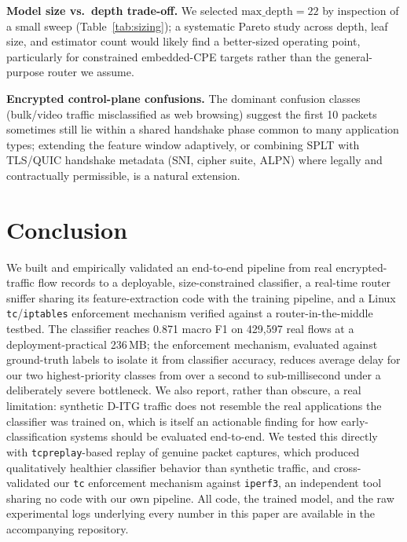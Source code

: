 \documentclass[10pt,twocolumn]{article}
\begin{document}
\textbf{Model size vs.\ depth trade-off.} We selected \(\text{max\_depth}=22\)
by inspection of a small sweep (Table~\ref{tab:sizing}); a systematic
Pareto study across depth, leaf size, and estimator count would likely
find a better-sized operating point, particularly for constrained
embedded-CPE targets rather than the general-purpose router we assume.

\textbf{Encrypted control-plane confusions.} The dominant confusion
classes (bulk/video traffic misclassified as web browsing) suggest the
first 10 packets sometimes still lie within a shared handshake phase
common to many application types; extending the feature window
adaptively, or combining SPLT with TLS/QUIC handshake metadata (SNI,
cipher suite, ALPN) where legally and contractually permissible, is a
natural extension.

\section{Conclusion}

We built and empirically validated an end-to-end pipeline from real
encrypted-traffic flow records to a deployable, size-constrained
classifier, a real-time router sniffer sharing its feature-extraction
code with the training pipeline, and a Linux \texttt{tc}/\texttt{iptables}
enforcement mechanism verified against a router-in-the-middle testbed.
The classifier reaches 0.871 macro F1 on 429{,}597 real flows at a
deployment-practical 236\,MB; the enforcement mechanism, evaluated
against ground-truth labels to isolate it from classifier accuracy,
reduces average delay for our two highest-priority classes from over a
second to sub-millisecond under a deliberately severe bottleneck. We also
report, rather than obscure, a real limitation: synthetic D-ITG traffic
does not resemble the real applications the classifier was trained on,
which is itself an actionable finding for how early-classification
systems should be evaluated end-to-end. We tested this directly with
\texttt{tcpreplay}-based replay of genuine packet captures, which produced
qualitatively healthier classifier behavior than synthetic traffic, and
cross-validated our \texttt{tc} enforcement mechanism against
\texttt{iperf3}, an independent tool sharing no code with our own
pipeline. All code, the trained model, and the raw experimental logs
underlying every number in this paper are available in the accompanying
repository.



\end{document}
